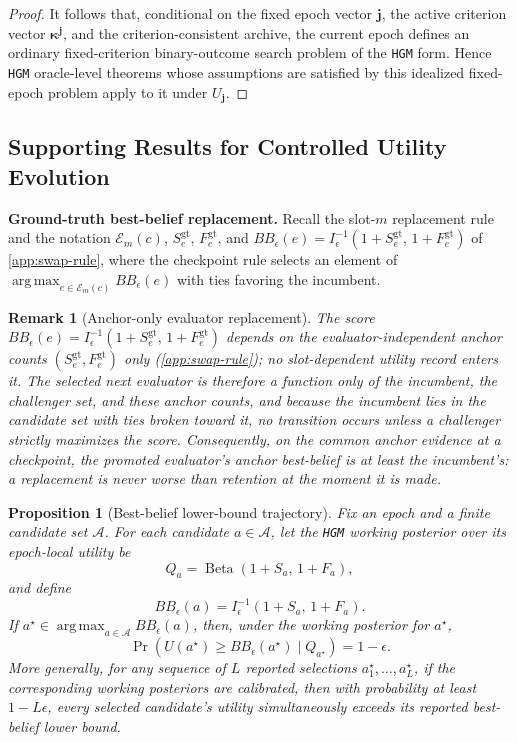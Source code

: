 \documentclass{paper}
\DeclareMathOperator*{\argmax}{arg\,max}
\newtheorem{proposition}{Proposition}
\newtheorem{remark}{Remark}
\newcommand{\hgm}{\texttt{HGM}\xspace}
\begin{document}
\begin{proof}
It follows that, conditional on the fixed epoch vector \(\boldsymbol{j}\), the active criterion vector
\(\boldsymbol{\kappa}^{\boldsymbol{j}}\), and the criterion-consistent archive, the current epoch defines an
ordinary fixed-criterion binary-outcome search problem of the \hgm form. Hence \hgm oracle-level
theorems whose assumptions are satisfied by this idealized fixed-epoch problem apply to it
under \(U_{\boldsymbol{j}}\).
\end{proof}



\subsection{Supporting Results for Controlled Utility Evolution}
\label{app:controlled_utility_proofs}


\noindent\textbf{Ground-truth best-belief replacement.}
Recall the slot-\(m\) replacement rule and the notation \(\mathcal E_m(c)\), \(S^{\mathrm{gt}}_e\), \(F^{\mathrm{gt}}_e\), and \(BB_\epsilon(e)=I^{-1}_{\epsilon}(1+S^{\mathrm{gt}}_e,\,1+F^{\mathrm{gt}}_e)\) of \cref{app:swap-rule}, where the checkpoint rule selects an element of \(\argmax_{e\in\mathcal E_m(c)}BB_\epsilon(e)\) with ties favoring the incumbent.

\begin{remark}[Anchor-only evaluator replacement]
\label{prop:anchor-best-belief-replacement}
The score \(BB_\epsilon(e)=I^{-1}_\epsilon(1+S^{\mathrm{gt}}_e,\,1+F^{\mathrm{gt}}_e)\) depends on the evaluator-independent anchor counts \((S^{\mathrm{gt}}_e,F^{\mathrm{gt}}_e)\) only (\cref{app:swap-rule}); no slot-dependent utility record enters it. The selected next evaluator is therefore a function only of the incumbent, the challenger set, and these anchor counts, and because the incumbent lies in the candidate set with ties broken toward it, no transition occurs unless a challenger strictly maximizes the score. Consequently, on the common anchor evidence at a checkpoint, the promoted evaluator's anchor best-belief is at least the incumbent's: a replacement is never worse than retention at the moment it is made.
\end{remark}

\begin{proposition}[Best-belief lower-bound trajectory]
\label{prop:best-belief-lower-bound}
Fix an epoch and a finite candidate set \(\mathcal A\). For each candidate \(a\in\mathcal A\), let the \hgm working posterior over its epoch-local utility be
\[
Q_a=\operatorname{Beta}(1+S_a,\,1+F_a),
\]
and define
\[
BB_\epsilon(a)=I^{-1}_\epsilon(1+S_a,\,1+F_a).
\]
If \(a^\star\in\argmax_{a\in\mathcal A}BB_\epsilon(a)\), then, under the working posterior for \(a^\star\),
\[
\Pr\!\left(U(a^\star)\ge BB_\epsilon(a^\star)\mid Q_{a^\star}\right)=1-\epsilon.
\]
More generally, for any sequence of \(L\) reported selections \(a^\star_1,\ldots,a^\star_L\), if the corresponding working posteriors are calibrated, then with probability at least \(1-L\epsilon\), every selected candidate's utility simultaneously exceeds its reported best-belief lower bound.
\end{proposition}
\end{document}
